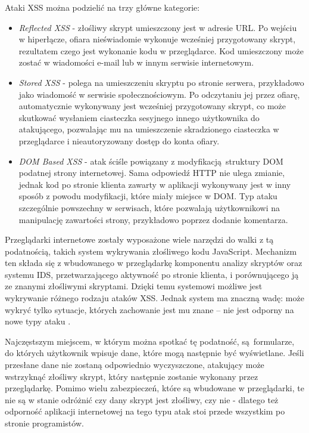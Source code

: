 \documentclass[12pt,twoside]{article}
\begin{document}
	Ataki XSS można podzielić na trzy główne kategorie:
	
	\begin{itemize}
		\item \emph{Reflected XSS} - złośliwy skrypt umieszczony jest w adresie URL. Po wejściu w hiperłącze, ofiara nieświadomie wykonuje wcześniej przygotowany skrypt, rezultatem czego jest wykonanie kodu w przeglądarce. Kod umieszczony może zostać w wiadomości e-mail lub w innym serwisie internetowym.
		\item \emph{Stored XSS} - polega na umieszczeniu skryptu po stronie serwera, przykładowo jako wiadomość w serwisie społecznościowym. Po odczytaniu jej przez ofiarę, automatycznie wykonywany jest wcześniej przygotowany skrypt, co może skutkować wysłaniem ciasteczka sesyjnego innego użytkownika do atakującego, pozwalając mu na umieszczenie skradzionego ciasteczka w przeglądarce i nieautoryzowany dostęp do konta ofiary.
		\item \emph{DOM Based XSS} - atak ściśle powiązany z modyfikacją struktury DOM podatnej strony internetowej. Sama odpowiedź HTTP nie ulega zmianie, jednak kod po stronie klienta zawarty w aplikacji wykonywany jest w inny sposób z powodu modyfikacji, które miały miejsce w DOM. Typ ataku szczególnie powszechny w serwisach, które pozwalają użytkownikowi na manipulację zawartości strony, przykładowo poprzez dodanie komentarza. 
	\end{itemize}
	
Przeglądarki internetowe zostały wyposażone wiele narzędzi do walki z tą podatnością, takich system wykrywania złośliwego kodu JavaScript. Mechanizm ten składa się z wbudowanego w przeglądarkę komponentu analizy skryptów oraz systemu IDS, przetwarzającego aktywność po stronie klienta, i porównującego ją ze znanymi złośliwymi skryptami. Dzięki temu systemowi możliwe jest wykrywanie różnego rodzaju ataków XSS. Jednak system ma znaczną wadę: może wykryć tylko sytuacje, których zachowanie jest mu znane -- nie jest odporny na nowe typy ataku \cite{XSSProtection}. 

Najczęstszym miejscem, w którym można spotkać tę podatność, są formularze, do których użytkownik wpisuje dane, które mogą następnie być wyświetlane. Jeśli przesłane dane nie zostaną odpowiednio wyczyszczone, atakujący może wstrzyknąć złośliwy skrypt, który następnie zostanie wykonany przez przeglądarkę. Pomimo wielu zabezpieczeń, które są wbudowane w przeglądarki, te nie są w stanie odróżnić czy dany skrypt jest złośliwy, czy nie - dlatego też odporność aplikacji internetowej na tego typu atak stoi przede wszystkim po stronie programistów.
	
\end{document}
